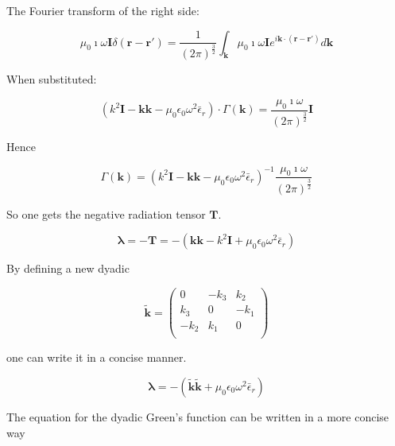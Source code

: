 \documentclass[a4paper,11pt]{article}
\begin{document}
The Fourier transform of the right side:

\begin{equation}
    \mu_0 \imath \omega \mathbf{I}  \delta (\mathbf{r}-\mathbf{r'})=\frac{1}{(2\pi )^{\frac{3}{2}}} \int_{\mathbf{k}} \mu_0 \imath \omega \mathbf{I}   e^{i\mathbf{k}\cdot (\mathbf{r}-\mathbf{r'})} d\mathbf{k}
\end{equation}

When substituted:

\begin{equation}
     \left(   k^2 \mathbf{I} -  \mathbf{kk} - \mu_0 \epsilon_0 \omega^2 \bar{\epsilon}_r\right) \cdot \Gamma(\mathbf{k}) = \frac{\mu_0 \imath \omega}{(2\pi )^{\frac{3}{2}}}  \mathbf{I} 
\end{equation}



Hence

\begin{equation}
    \Gamma(\mathbf{k}) =\left(  k^2 \mathbf{I} - \mathbf{kk} -  \mu_0 \epsilon_0 \omega^2\bar{\epsilon}_r\right)^{-1} \frac{\mu_0 \imath \omega }{(2\pi )^{\frac{3}{2}}}
\end{equation}

So one gets the negative radiation tensor $\mathbf{T}$.

\begin{equation}\label{eq:rel_t_lambda}
    \mathbf{\lambda}=-\mathbf{T}=-\left( \mathbf{kk} - k^2 \mathbf{I} +   \mu_0 \epsilon_0 \omega^2 \bar{\epsilon}_r\right)
\end{equation}

By defining a new dyadic

\begin{equation}
    \mathbf{\tilde{k}}=\left(%
\begin{array}{ccc}
  0 & -k_3 & k_2 \\
k_3 & 0 & -k_1 \\
-k_2 & k_1 & 0 \\\end{array}%
\right)
\end{equation}

one can write it in a concise manner.

\begin{equation}
    \mathbf{\lambda}=-\left( \mathbf{\tilde{k}\tilde{k}} +  \mu_0 \epsilon_0 \omega^2 \bar{\epsilon}_r\right)
\end{equation}

The equation for the dyadic Green's function can be written in a more concise way
\end{document}
